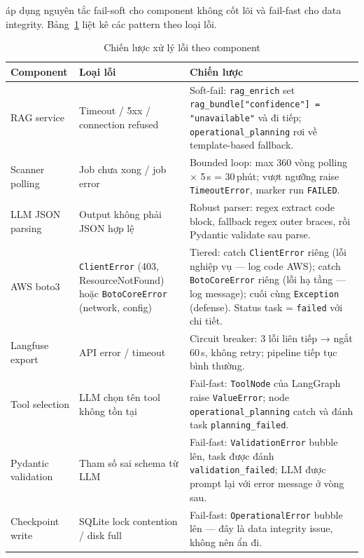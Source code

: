 \sysnameshort{} áp dụng nguyên tắc fail-soft cho component không cốt lõi và fail-fast cho data integrity. Bảng~\ref{tab:error_strategy} liệt kê các pattern theo loại lỗi.

\begin{table}[!htb]
  \centering
  \caption{Chiến lược xử lý lỗi theo component}
  \label{tab:error_strategy}
  \renewcommand{\arraystretch}{1.2}
  \begin{tabular}{|p{3.0cm}|p{4.5cm}|p{6.0cm}|}
    \hline
    \textbf{Component} & \textbf{Loại lỗi} & \textbf{Chiến lược} \\ \hline
    RAG service       & Timeout / 5xx / connection refused & Soft-fail: \texttt{rag\_enrich} set \texttt{rag\_bundle["confidence"] = "unavailable"} và đi tiếp; \texttt{operational\_planning} rơi về template-based fallback. \\ \hline
    Scanner polling   & Job chưa xong / job error & Bounded loop: max 360 vòng polling × 5\,s = 30\,phút; vượt ngưỡng raise \texttt{TimeoutError}, marker run \texttt{FAILED}. \\ \hline
    LLM JSON parsing  & Output không phải JSON hợp lệ & Robust parser: regex extract code block, fallback regex outer braces, rồi Pydantic validate sau parse. \\ \hline
    AWS boto3         & \texttt{ClientError} (403, ResourceNotFound) hoặc \texttt{BotoCoreError} (network, config) & Tiered: catch \texttt{ClientError} riêng (lỗi nghiệp vụ — log code AWS); catch \texttt{BotoCoreError} riêng (lỗi hạ tầng — log message); cuối cùng \texttt{Exception} (defense). Status task = \texttt{failed} với chi tiết. \\ \hline
    Langfuse export   & API error / timeout & Circuit breaker: 3 lỗi liên tiếp → ngắt 60\,s, không retry; pipeline tiếp tục bình thường. \\ \hline
    Tool selection    & LLM chọn tên tool không tồn tại & Fail-fast: \texttt{ToolNode} của LangGraph raise \texttt{ValueError}; node \texttt{operational\_planning} catch và đánh task \texttt{planning\_failed}. \\ \hline
    Pydantic validation & Tham số sai schema từ LLM & Fail-fast: \texttt{ValidationError} bubble lên, task được đánh \texttt{validation\_failed}; LLM được prompt lại với error message ở vòng sau. \\ \hline
    Checkpoint write  & SQLite lock contention / disk full & Fail-fast: \texttt{OperationalError} bubble lên — đây là data integrity issue, không nên ẩn đi. \\ \hline
  \end{tabular}
\end{table}

